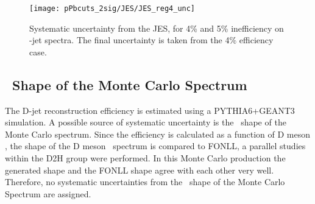 \begin{figure}[bth]
\centering
\texttt{[image: pPbcuts\_2sig/JES/JES\_reg4\_unc]}
\caption{Systematic uncertainty from the JES, for 4\% and 5\% inefficiency on \Dzero-jet spectra. The final uncertainty is taken from the 4\% efficiency case. }
\label{fig:JESsys_Dzero}
\end{figure}


\subsection{\pt\ Shape of the Monte Carlo Spectrum}

The D-jet reconstruction efficiency is estimated using a PYTHIA6+GEANT3 simulation.
A possible source of systematic uncertainty is the \ptd\ shape of the Monte Carlo spectrum.
Since the efficiency is calculated as a function of D meson , the shape of the D meson \ptd\ spectrum is compared to FONLL, a parallel studies within the D2H group were performed. In this Monte Carlo production the generated shape and the FONLL shape agree with each other very well. Therefore, no systematic uncertainties from the \ptd\ shape of the Monte Carlo Spectrum are assigned.


